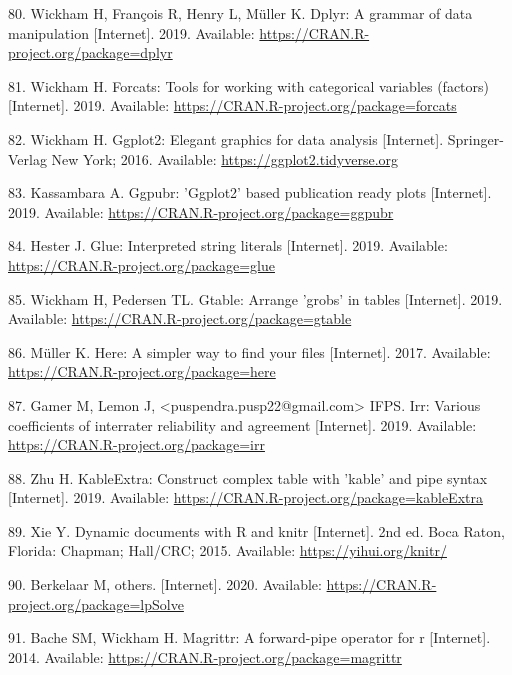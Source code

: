 \documentclass[10pt,letterpaper]{article}
\begin{document}
\leavevmode\hypertarget{ref-R-dplyr}{}%
80. Wickham H, François R, Henry L, Müller K. Dplyr: A grammar of data manipulation {[}Internet{]}. 2019. Available: \url{https://CRAN.R-project.org/package=dplyr}

\leavevmode\hypertarget{ref-R-forcats}{}%
81. Wickham H. Forcats: Tools for working with categorical variables (factors) {[}Internet{]}. 2019. Available: \url{https://CRAN.R-project.org/package=forcats}

\leavevmode\hypertarget{ref-R-ggplot2}{}%
82. Wickham H. Ggplot2: Elegant graphics for data analysis {[}Internet{]}. Springer-Verlag New York; 2016. Available: \url{https://ggplot2.tidyverse.org}

\leavevmode\hypertarget{ref-R-ggpubr}{}%
83. Kassambara A. Ggpubr: 'Ggplot2' based publication ready plots {[}Internet{]}. 2019. Available: \url{https://CRAN.R-project.org/package=ggpubr}

\leavevmode\hypertarget{ref-R-glue}{}%
84. Hester J. Glue: Interpreted string literals {[}Internet{]}. 2019. Available: \url{https://CRAN.R-project.org/package=glue}

\leavevmode\hypertarget{ref-R-gtable}{}%
85. Wickham H, Pedersen TL. Gtable: Arrange 'grobs' in tables {[}Internet{]}. 2019. Available: \url{https://CRAN.R-project.org/package=gtable}

\leavevmode\hypertarget{ref-R-here}{}%
86. Müller K. Here: A simpler way to find your files {[}Internet{]}. 2017. Available: \url{https://CRAN.R-project.org/package=here}

\leavevmode\hypertarget{ref-R-irr}{}%
87. Gamer M, Lemon J, \textless{}puspendra.pusp22@gmail.com\textgreater{} IFPS. Irr: Various coefficients of interrater reliability and agreement {[}Internet{]}. 2019. Available: \url{https://CRAN.R-project.org/package=irr}

\leavevmode\hypertarget{ref-R-kableExtra}{}%
88. Zhu H. KableExtra: Construct complex table with 'kable' and pipe syntax {[}Internet{]}. 2019. Available: \url{https://CRAN.R-project.org/package=kableExtra}

\leavevmode\hypertarget{ref-R-knitr}{}%
89. Xie Y. Dynamic documents with R and knitr {[}Internet{]}. 2nd ed. Boca Raton, Florida: Chapman; Hall/CRC; 2015. Available: \url{https://yihui.org/knitr/}

\leavevmode\hypertarget{ref-R-lpSolve}{}%
90. Berkelaar M, others. {[}Internet{]}. 2020. Available: \url{https://CRAN.R-project.org/package=lpSolve}

\leavevmode\hypertarget{ref-R-magrittr}{}%
91. Bache SM, Wickham H. Magrittr: A forward-pipe operator for r {[}Internet{]}. 2014. Available: \url{https://CRAN.R-project.org/package=magrittr}
\end{document}
